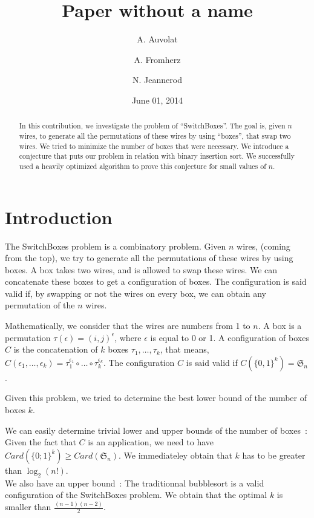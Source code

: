 \documentclass[11pt, a4paper]{article}
\begin{document}
\title{ Paper without a name }
\author{A. Auvolat \and A. Fromherz \and N. Jeannerod }
\date{June 01, 2014}
\maketitle

\begin{abstract}

In this contribution, we investigate the problem of ``SwitchBoxes''.  The goal is,
given $n$ wires, to generate all the permutations of these wires by using
``boxes'', that swap two wires. We tried to minimize the number of boxes that were
necessary.  We introduce a conjecture that puts our problem in relation with
binary insertion sort.  We successfully used a heavily optimized algorithm to
prove this conjecture for small values of $n$.

\end{abstract}

\section{Introduction}

The SwitchBoxes problem is a combinatory problem. Given $n$ wires, (coming from
the top), we try to generate all the permutations of these wires by using boxes.
A box takes two wires, and is allowed to swap these wires. We can concatenate
these boxes to get a configuration of boxes.  The configuration is said valid
if, by swapping or not the wires on every box, we can obtain any permutation of
    the $n$ wires.

Mathematically, we consider that the wires are numbers from 1 to $n$. A box is a
permutation $\tau(\epsilon) = (i,j)^{\epsilon}$, where $\epsilon$ is equal to 0
or 1.  A configuration of boxes $C$ is the concatenation of $k$ boxes $\tau_1,
\ldots, \tau_k$, that means, $C(\epsilon_1, \ldots, \epsilon_k) =
\tau_1^{\epsilon_1}\circ\ldots\circ\tau_k^{\epsilon_k}$.  The configuration $C$ is
said valid if $C(\{0,1\}^k)= \mathfrak{S}_n$.

Given this problem, we tried to determine the best lower bound of the number of
boxes $k$.

We can easily determine trivial lower and upper bounds of the number of
boxes~:\\ Given the fact that $C$ is an application, we need to have
$Card(\{0;1\}^{k}) \geq Card(\mathfrak{S}_n)$. We immediateley obtain that $k$
has to be greater than $\log_2(n!)$.\\ We also have an upper bound~: The
traditionnal bubblesort is a valid configuration of the SwitchBoxes problem. We
obtain that the optimal $k$ is smaller than $\frac{(n-1)(n-2)}{2}$.
\end{document}
